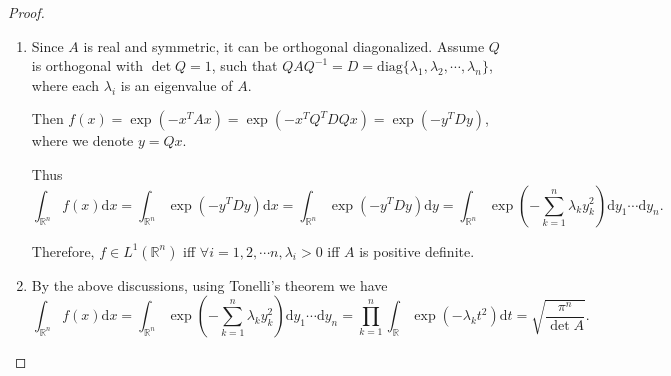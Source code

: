 \begin{proof}
	\begin{enumerate}
	\item Since $ A $ is real and symmetric, it can be orthogonal diagonalized. Assume $ Q $ is orthogonal with $ \det Q=1 $, such that $ QAQ^{-1}=D=\mathrm{diag} \{\lambda_{1},\lambda_{2},\cdots,\lambda_{n}\} $, where each $ \lambda_{i} $ is an eigenvalue of $ A $.
	
	Then $ f(x)=\exp(-x^{T}Ax)=\exp(-x^{T}Q^{T}DQx)=\exp(-y^{T}Dy) $, where we denote $ y=Qx $.
	
	Thus 
	$$
	\int_{\mathbb{R}^n}^{}{f( x ) \mathrm{d} x}=\int_{\mathbb{R}^n}^{}{\exp \left( -y^TDy \right) \mathrm{d} x}=\int_{\mathbb{R}^n}^{}{\exp \left( -y^TDy \right) \mathrm{d} y}=\int_{\mathbb{R}^n}^{}{\exp \left( -\sum_{k=1}^n{\lambda _ky_{k}^{2}} \right) \mathrm{d} y_1\cdots \mathrm{d} y_n}.
	$$
	
	Therefore, $ f\in L^{1}(\mathbb{R} ^{n}) $ iff $ \forall i=1,2,\cdots n,\lambda_{i}>0  $ iff $ A $ is positive definite.
	\item By the above discussions, using Tonelli's theorem we have 
	$$
	\int_{\mathbb{R}^n}^{}{f( x ) \mathrm{d} x}=\int_{\mathbb{R}^n}^{}{\exp \left( -\sum_{k=1}^n{\lambda _ky_{k}^{2}} \right) \mathrm{d} y_1\cdots \mathrm{d} y_n}=\prod_{k=1}^n{\int_{\mathbb{R}}^{}{\exp \left( -\lambda _kt^2 \right) \mathrm{d} t}}=\sqrt{\frac{\pi^{n}}{\det A}}.
	$$
	\end{enumerate}
\end{proof}